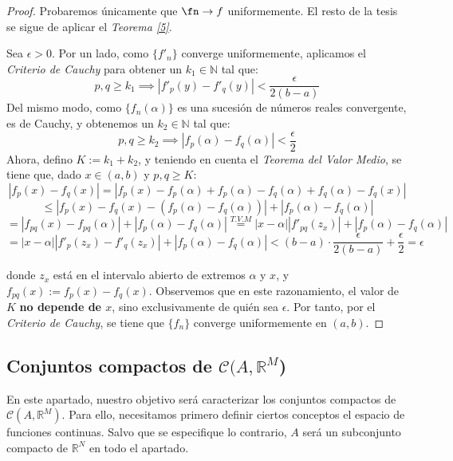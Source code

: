   \begin{proof}
    Probaremos únicamente que $\fn \to f$ uniformemente. El resto de la tesis se sigue de aplicar el \textit{Teorema \ref{5}}.

    Sea $\epsilon > 0$. Por un lado, como $\{f'_n\}$ converge uniformemente, aplicamos el \textit{Criterio de Cauchy} para obtener un $k_1 \in \mathbb{N}$ tal que: $$p,q \ge k_1 \implies |f'_p(y) - f'_q(y)| < \frac{\epsilon}{2 (b-a)}$$
    Del mismo modo, como $\{f_n(\alpha)\}$ es una sucesión de números reales convergente, es de Cauchy, y obtenemos un $k_2 \in \mathbb{N}$ tal que: $$p,q \ge k_2 \implies |f_p(\alpha) - f_q(\alpha)| < \frac{\epsilon}{2}$$
    Ahora, defino $K := k_1 + k_2$, y teniendo en cuenta el \textit{Teorema del Valor Medio}, se tiene que, dado $x \in (a,b)$ y $p,q \ge K$: $$|f_p(x) - f_q(x)| = |f_p(x) - f_p(\alpha) + f_p(\alpha) - f_q(\alpha) + f_q(\alpha) - f_q(x)|$$ $$\le |f_p(x) - f_q(x) - (f_p(\alpha) - f_q(\alpha))| + |f_p(\alpha) - f_q(\alpha)| $$ $$= |f_{pq}(x) - f_{pq}(\alpha)| + |f_p(\alpha) - f_q(\alpha)| \overset{T.V.M}{=} |x-\alpha||f'_{pq}(z_x)| + |f_p(\alpha) - f_q(\alpha)|$$ $$= \left|x-\alpha \right|\left| f'_p(z_x) - f'_q(z_x) \right| + |f_p(\alpha) - f_q(\alpha)| < (b-a) \cdot \frac{\epsilon}{2(b-a)} + \frac{\epsilon}{2} = \epsilon$$

    donde $z_x$ está en el intervalo abierto de extremos $\alpha$ y $x$, y $f_{pq}(x) := f_p(x) - f_q(x)$. Observemos que en este razonamiento, el valor de $K$ \textbf{no depende de $x$}, sino exclusivamente de quién sea $\epsilon$. Por tanto, por el \textit{Criterio de Cauchy}, se tiene que $\{f_n\}$ converge uniformemente en $(a,b)$.
  \end{proof}


\subsection{Conjuntos compactos de $\mathcal{C}(A, \mathbb{R}^M$)}

En este apartado, nuestro objetivo será caracterizar los conjuntos compactos de $\mathcal{C}(A,\mathbb{R}^M)$. Para ello, necesitamos primero definir ciertos conceptos el espacio de funciones continuas. Salvo que se especifique lo contrario, $A$ será un subconjunto compacto de $\mathbb{R}^N$ en todo el apartado.

